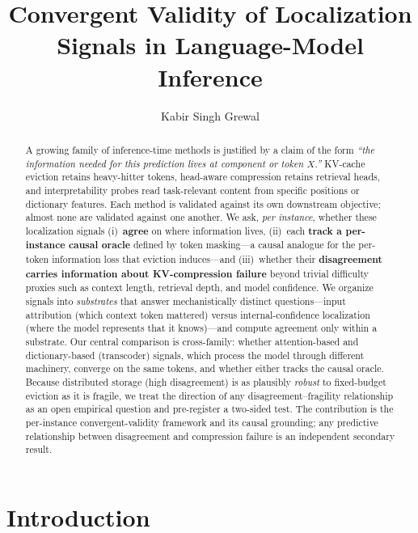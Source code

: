 \documentclass[11pt]{article}
\title{Convergent Validity of Localization Signals in Language-Model Inference}
\author{Kabir Singh Grewal}
\date{}
\begin{document}
\maketitle

\begin{abstract}
A growing family of inference-time methods is justified by a claim of the
form \emph{``the information needed for this prediction lives at component
or token $X$.''} KV-cache eviction retains heavy-hitter tokens, head-aware
compression retains retrieval heads, and interpretability probes read
task-relevant content from specific positions or dictionary features. Each
method is validated against its own downstream objective; almost none are
validated against one another. We ask, \emph{per instance}, whether these
localization signals (i)~\textbf{agree} on where information lives,
(ii)~each \textbf{track a per-instance causal oracle} defined by token
masking---a causal analogue for the per-token information loss that eviction
induces---and (iii)~whether their
\textbf{disagreement carries information about KV-compression failure}
beyond trivial difficulty proxies such as context length, retrieval depth,
and model confidence. We organize signals into \emph{substrates} that answer
mechanistically distinct questions---input attribution (which context token
mattered) versus internal-confidence localization (where the model
represents that it knows)---and compute agreement only within a substrate.
Our central comparison is cross-family: whether attention-based and
dictionary-based (transcoder) signals, which process the model through
different machinery, converge on the same tokens, and whether either tracks
the causal oracle. Because distributed storage (high disagreement) is as
plausibly \emph{robust} to fixed-budget eviction as it is fragile, we treat
the direction of any disagreement--fragility relationship as an open
empirical question and pre-register a two-sided test. The contribution is
the per-instance convergent-validity framework and its causal grounding; any
predictive relationship between disagreement and compression failure is an
independent secondary result.
\end{abstract}

\section{Introduction}
\end{document}
